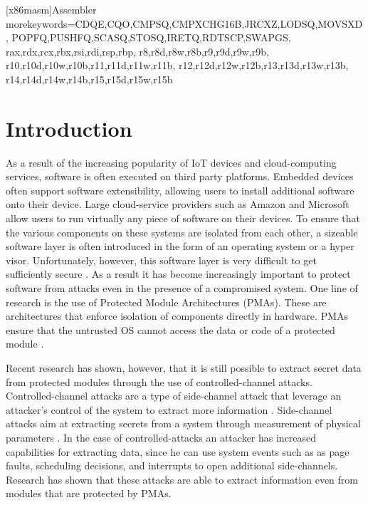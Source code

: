 
   [x86masm]{Assembler} %
   {morekeywords={CDQE,CQO,CMPSQ,CMPXCHG16B,JRCXZ,LODSQ,MOVSXD, %
                  POPFQ,PUSHFQ,SCASQ,STOSQ,IRETQ,RDTSCP,SWAPGS, %
                  rax,rdx,rcx,rbx,rsi,rdi,rsp,rbp, %
                  r8,r8d,r8w,r8b,r9,r9d,r9w,r9b, %
                  r10,r10d,r10w,r10b,r11,r11d,r11w,r11b, %
                  r12,r12d,r12w,r12b,r13,r13d,r13w,r13b, %
                  r14,r14d,r14w,r14b,r15,r15d,r15w,r15b}} %


\chapter{Introduction}
\label{cha:introduction}
As a result of the increasing popularity of IoT devices and cloud-computing services, software is often executed on third party platforms. 
Embedded devices often support software extensibility, allowing users to install additional software onto their device. 
Large cloud-service providers such as Amazon and Microsoft allow users to run virtually any piece of software on their devices. 
To ensure that the various components on these systems are isolated from each other, a sizeable software layer is often introduced in the form of an operating system or 
a hyper visor.
Unfortunately, however, this software layer is very difficult to get sufficiently secure \cite{psma}.
As a result it has become increasingly important to protect software from attacks even in the presence of a compromised system. 
One line of research is the use of Protected Module Architectures (PMAs). 
These are architectures that enforce isolation of components directly in hardware.
PMAs ensure that the untrusted OS cannot access the data or code of a protected module \cite{Nemesis}. 

Recent research has shown, however, that it is still possible to extract secret data from protected modules through the use of controlled-channel attacks. 
Controlled-channel attacks are a type of side-channel attack that leverage an attacker's control of the system to extract more information \cite{Xu}.	
Side-channel attacks aim at extracting secrets from a system through measurement of physical parameters \cite{side-channel}. 
In the case of controlled-attacks an attacker has increased capabilities for extracting data, since he can use system events such as as page faults, scheduling decisions, and interrupts to open additional side-channels. 
Research has shown that these attacks are able to extract information even from modules that are protected by PMAs. 

